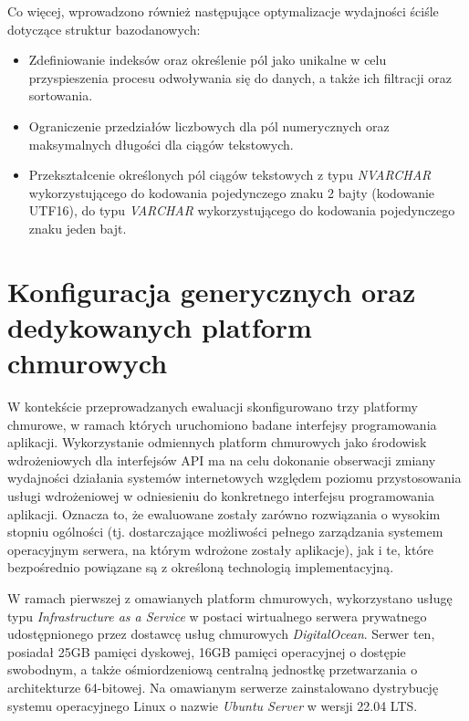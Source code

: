 Co więcej, wprowadzono również następujące optymalizacje wydajności ściśle dotyczące struktur bazodanowych:
\begin{itemize}
    \item Zdefiniowanie indeksów oraz określenie pól jako unikalne w celu przyspieszenia procesu odwoływania się do danych, a także ich filtracji oraz sortowania.
    \item Ograniczenie przedziałów liczbowych dla pól numerycznych oraz maksymalnych długości dla ciągów tekstowych.
    \item Przekształcenie określonych pól ciągów tekstowych z typu \textit{NVARCHAR} wykorzystującego do kodowania pojedynczego znaku 2 bajty (kodowanie UTF16), do typu \textit{VARCHAR} wykorzystującego do kodowania pojedynczego znaku jeden bajt.
\end{itemize}
\section{Konfiguracja generycznych oraz dedykowanych platform chmurowych}
W kontekście przeprowadzanych ewaluacji skonfigurowano trzy platformy chmurowe, w ramach których uruchomiono badane interfejsy programowania aplikacji. Wykorzystanie odmiennych platform chmurowych jako środowisk wdrożeniowych dla interfejsów API ma na celu dokonanie obserwacji zmiany wydajności działania systemów internetowych względem poziomu przystosowania usługi wdrożeniowej w odniesieniu do konkretnego interfejsu programowania aplikacji. Oznacza to, że ewaluowane zostały zarówno rozwiązania o wysokim stopniu ogólności (tj. dostarczające możliwości pełnego zarządzania systemem operacyjnym serwera, na którym wdrożone zostały aplikacje), jak i te, które bezpośrednio powiązane są z określoną technologią implementacyjną.

W ramach pierwszej z omawianych platform chmurowych, wykorzystano usługę typu \textit{Infrastructure as a Service} w postaci wirtualnego serwera prywatnego udostępnionego przez dostawcę usług chmurowych \textit{DigitalOcean}. Serwer ten, posiadał 25GB pamięci dyskowej, 16GB pamięci operacyjnej o dostępie swobodnym, a także ośmiordzeniową centralną jednostkę przetwarzania o architekturze 64-bitowej. Na omawianym serwerze zainstalowano dystrybucję systemu operacyjnego Linux o nazwie \textit{Ubuntu Server} w wersji 22.04 LTS.

